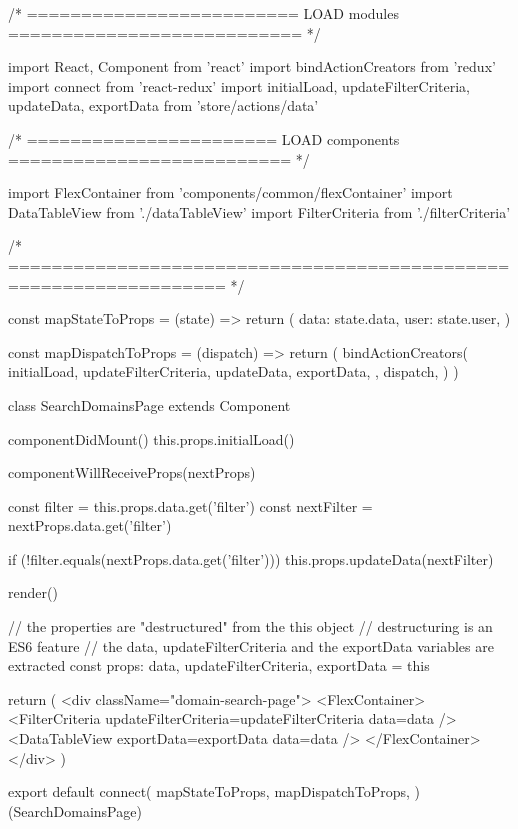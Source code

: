 \begin{JsCode}
/* ========================= LOAD modules =========================== */

import React, { Component } from 'react'
import { bindActionCreators } from 'redux'
import { connect } from 'react-redux'
import { 
  initialLoad, 
  updateFilterCriteria, 
  updateData, 
  exportData 
} from 'store/actions/data'

/* ======================= LOAD components ========================== */

import FlexContainer from 'components/common/flexContainer'
import DataTableView from './dataTableView'
import FilterCriteria from './filterCriteria'

/* ================================================================== */

const mapStateToProps = (state) => {
  return ({
    data: state.data,
    user: state.user,
  })
}

const mapDispatchToProps = (dispatch) => {
  return (
    bindActionCreators(
      {
        initialLoad,
        updateFilterCriteria,
        updateData,
        exportData,
      },
      dispatch,
    )
  )
}

class SearchDomainsPage extends Component {

  componentDidMount() {
    this.props.initialLoad()
  }

  componentWillReceiveProps(nextProps) {

    const filter = this.props.data.get('filter')
    const nextFilter = nextProps.data.get('filter')

    if (!filter.equals(nextProps.data.get('filter'))) {
      this.props.updateData(nextFilter)
    }
  }

  render() {

    // the properties are "destructured" from the this object
    // destructuring is an ES6 feature
    // the data, updateFilterCriteria and the exportData variables are extracted
    const { props: { data, updateFilterCriteria, exportData } } = this

    return (
      <div className="domain-search-page">
        <FlexContainer>
          <FilterCriteria
            updateFilterCriteria={updateFilterCriteria}
            data={data}
          />
          <DataTableView
            exportData={exportData}
            data={data}
          />
        </FlexContainer>
      </div>
    )
  }
}

export default connect(
  mapStateToProps,
  mapDispatchToProps,
)(SearchDomainsPage)
\end{JsCode}

